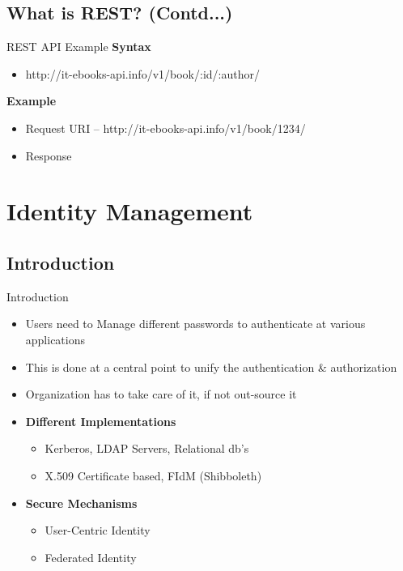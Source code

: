 \documentclass[xcolor=dvipsnames]{beamer}
\begin{document}
\subsection{What is REST? (Contd...)}
\begin{frame}{REST API Example}
\textbf{Syntax}
\begin{itemize}
	\item http://it-ebooks-api.info/v1/book/:id/:author/
\end{itemize}
\textbf{Example}
\begin{itemize}
	\item Request URI -- http://it-ebooks-api.info/v1/book/1234/
	\item Response 
\end{itemize}


\end{frame}

\section{Identity Management}
\subsection{Introduction}
\begin{frame}{Introduction}
\begin{itemize}
	\item Users need to Manage different passwords to authenticate at various applications
	\item This is done at a central point to unify the authentication \& authorization
	\item Organization has to take care of it, if not out-source it
	\item \textbf{Different Implementations}
\begin{itemize}
	\item Kerberos, LDAP Servers, Relational db's
	\item X.509 Certificate based, FIdM (Shibboleth)
\end{itemize}
	\item \textbf{Secure Mechanisms}
\begin{itemize}
	\item User-Centric Identity
	\item Federated Identity
\end{itemize}
\end{itemize}
\end{frame}
\end{document}
